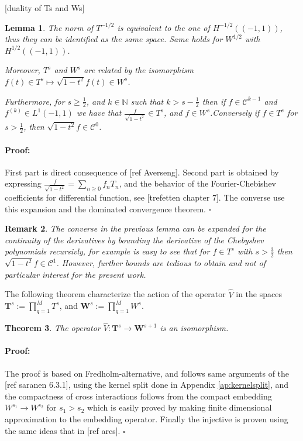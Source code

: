 \documentclass{article}
\newtheorem{theorem}{Theorem}[section]
\newtheorem{lemma}[theorem]{Lemma}
\newtheorem{remark}[theorem]{Remark}
\newenvironment{proof}{\paragraph{Proof:}}{\hfill$\square$}
\newcommand{\todo}[1]{{\color{red}[#1]}}
\newcommand{\IN}{{\mathbb N}}
\begin{document}
\todo{duality of Ts and Ws}
\begin{lemma}
\label{lemma:tsprops}
The norm of $T^{-1/2}$ is equivalent to the one of $H^{-1/2}((-1,1))$, thus they can be identified as the same space. Same holds for $W^{1/2}$ with $H^{1/2}((-1,1))$.

Moreover, $T^s$ and $W^s$ are related by the isomorphism $f(t) \in T^s \mapsto \sqrt{1-t^2}f(t) \in W^s$. 

Furthermore,  for $s  \geq \frac{1}{2}$, and $k \in \IN$ such that $k>s-\frac{1}{2}$ then if $f \in \mathcal{C}^{k-1}$ and $f^{(k)} \in L^1(-1,1)$ we have that $\frac{f}{\sqrt{1-t^2}} \in T^s$, and $f \in W^s$.Conversely if $f \in T^s$ for $s>\frac{1}{2}$, then $\sqrt{1-t^2}f \in \mathcal{C}^0$. 
\end{lemma}

\begin{proof}
First part is direct consequence of \todo{ref Averseng}. Second part is obtained by expressing $\frac{f}{\sqrt{1-t^2}} = \sum_{n\geq 0} f_n T_n$, and the behavior of the Fourier-Chebishev coefficients for differential function, see \todo{trefetten chapter 7}. The converse use this expansion and the dominated convergence theorem. 
\end{proof}

\begin{remark}
\label{rem:regts}
The converse in the previous lemma can be expanded for the continuity of the derivatives by bounding the derivative of the Chebyshev polynomials recursivly, for example is easy to see that for $f \in T^s$ with $s>\frac{3}{2}$ then $\sqrt{1-t^2}f  \in \mathcal{C}^1$. However, further bounds are tedious to obtain and not of particular interest for the present work. 
\end{remark}

The following theorem characterize the action of the operator $\widehat{V}$ in the spaces $\mathbf{T}^s := \prod_{q=1}^M T^s$, and $\mathbf{W}^s  := \prod_{q=1}^M W^s$. 

\begin{theorem} 
\label{theorm:wellpossed}
The operator $\widehat{V} : \mathbf{T}^s \rightarrow \mathbf{W}^{s+1}$ is an isomorphism. 
\end{theorem}
\begin{proof}
The proof is based on Fredholm-alternative, and follows same arguments of the \todo{ref saranen 6.3.1}, using the kernel split done in Appendix \ref{ap:kernelsplit}, and the compactness of cross interactions follows from the compact embedding $W^{s_1} \rightarrow W^{s_2}$ for $s_1 > s_2$ which is easily proved by making finite dimensional approximation to the embedding operator.
Finally the injective is proven using the same ideas that in \todo{ref arcs}.
\end{proof}
\end{document}
